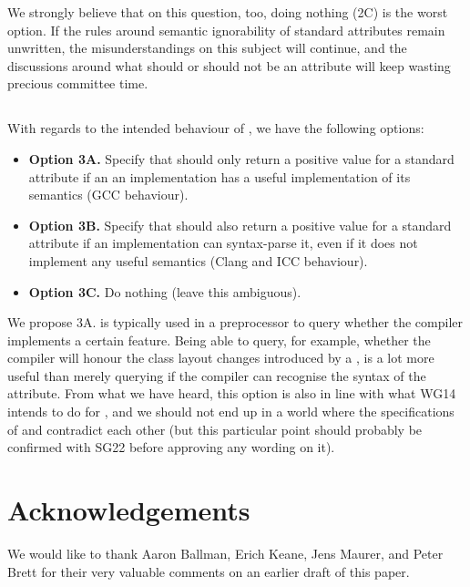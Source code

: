 We strongly believe that on this question, too, doing nothing (2C) is the worst option. If the rules around semantic ignorability of standard attributes remain unwritten, the misunderstandings on this subject will continue, and the discussions around what should or should not be an attribute will keep wasting precious committee time.

\subsection{}

With regards to the intended behaviour of , we have the following options:

\begin{itemize}
\item \textbf{Option 3A.} Specify that  should only return a positive value for a standard attribute if an an implementation has a useful implementation of its semantics (GCC behaviour).
\item \textbf{Option 3B.} Specify that  should also return a positive value for a standard attribute if an implementation can syntax-parse it, even if it does not implement any useful semantics (Clang and ICC behaviour).
\item \textbf{Option 3C.} Do nothing (leave this ambiguous).
\end{itemize}

We propose 3A.  is typically used in a preprocessor  to query whether the compiler implements a certain feature. Being able to query, for example, whether the compiler will honour the class layout changes introduced by a , is a lot more useful than merely querying if the compiler can recognise the syntax of the attribute. From what we have heard, this option is also in line with what WG14 intends to do for , and we should not end up in a world where the specifications of  and  contradict each other (but this particular point should probably be confirmed with SG22 before approving any wording on it).

\section*{Acknowledgements}
We would like to thank Aaron Ballman, Erich Keane, Jens Maurer, and Peter Brett for their very valuable comments on an earlier draft of this paper.

\renewcommand{\bibname}{References}



